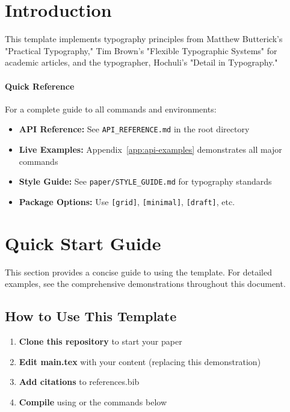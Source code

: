 \documentclass[11pt]{article}
\begin{document}



\section{Introduction}
\label{sec:introduction}

This template implements typography principles from Matthew Butterick's "Practical Typography," Tim Brown's "Flexible Typographic Systems" for academic articles, and the typographer, Hochuli's "Detail in Typography."

\paragraph{Quick Reference}
For a complete guide to all commands and environments:
\begin{itemize}
  \item \textbf{API Reference:} See \texttt{API\_REFERENCE.md} in the root directory
  \item \textbf{Live Examples:} Appendix~\ref{app:api-examples} demonstrates all major commands
  \item \textbf{Style Guide:} See \texttt{paper/STYLE\_GUIDE.md} for typography standards
  \item \textbf{Package Options:} Use \texttt{[grid]}, \texttt{[minimal]}, \texttt{[draft]}, etc.
\end{itemize}

\section{Quick Start Guide}
\label{sec:quickstart}

This section provides a concise guide to using the template. For detailed examples, see the comprehensive demonstrations throughout this document.

\subsection{How to Use This Template}

\begin{enumerate}
\item \textbf{Clone this repository} to start your paper
\item \textbf{Edit main.tex} with your content (replacing this demonstration)
\item \textbf{Add citations} to references.bib
\item \textbf{Compile} using  or the commands below
\end{enumerate}
\end{document}

